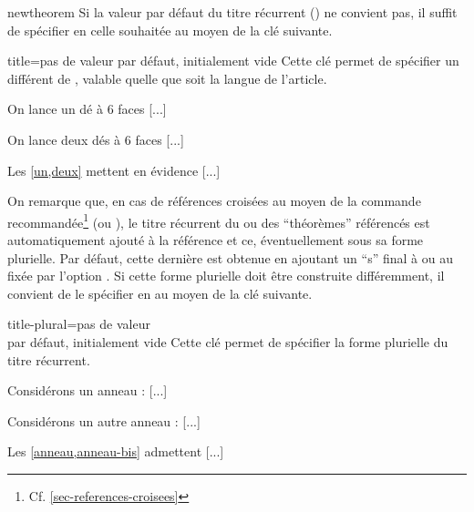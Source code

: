 \documentclass[english,nolocaltoc]{nwejmart}
\newtheorem[style=definition]{fait}
\newtheorem[title=expérience]{experience}
\newtheorem[title-plural=anneaux]{anneau}
\newtheorem[title=idéal,title-plural=idéaux]{ideal}
\begin{document}
\begin{docCommand}{newtheorem}{}
  Si la valeur par défaut du titre récurrent () ne convient pas, il
  suffit de spécifier en  celle souhaitée au moyen de la clé
   suivante.
  \begin{docKey}{title}{={}}{pas de
      valeur par défaut, initialement vide}
    Cette clé permet de spécifier un  différent de
    , valable quelle que soit la langue de l'article.
  \end{docKey}
\begin{bodycode}[listing and text,listing options={deletekeywords={[2]label}}]
\begin{experience}\label{un}
On lance un dé à 6 faces [...]
\end{experience}
\begin{experience}\label{deux}
On lance deux dés à 6 faces [...]
\end{experience}
Les \vref{un,deux} mettent en évidence [...]
\end{bodycode}

  On remarque que, en cas de références croisées au moyen de la commande
  recommandée\footnote{Cf. \vref{sec-references-croisees}}  (ou
  ), le titre récurrent du ou des \enquote{théorèmes} référencés
  est automatiquement ajouté à la référence et ce, éventuellement sous sa forme
  plurielle. Par défaut, cette dernière est obtenue en ajoutant un \enquote{s}
  final à  ou au  fixée par l'option
  . Si cette forme plurielle doit être construite différemment, il
  convient de le spécifier en  au moyen de la clé
   suivante.
  \begin{docKey}{title-plural}{={}}{pas de
      valeur\\par défaut, initialement vide}
    Cette clé permet de spécifier la forme plurielle du titre récurrent.
  \end{docKey}
\begin{bodycode}[listing and text,listing options={deletekeywords={[2]label}}]
\begin{anneau}\label{anneau}
Considérons un anneau : [...]
\end{anneau}
\begin{anneau}\label{anneau-bis}
Considérons un autre anneau : [...]
\end{anneau}
Les \vref{anneau,anneau-bis} admettent [...]
\end{bodycode}


\end{docCommand}
\end{document}
